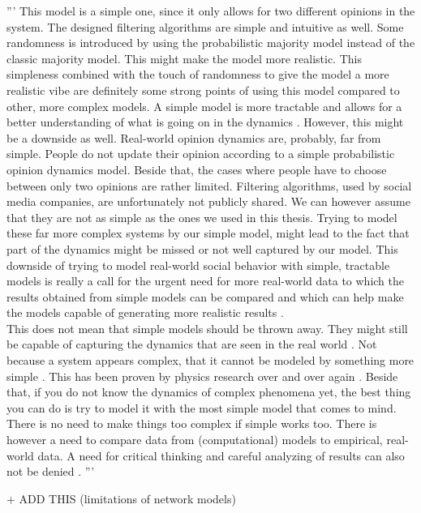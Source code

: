 \documentclass[11 pt , letterpaper , twoside , openright]{book}
\begin{document}
''' This model is a simple one, since it only allows for two different opinions in the system. The designed filtering algorithms are simple and intuitive as well. Some randomness is introduced by using the probabilistic majority model instead of the classic majority model. This might make the model more realistic. This simpleness combined with the touch of randomness to give the model a more realistic vibe are definitely some strong points of using this model compared to other, more complex models. A simple model is more tractable and allows for a better understanding of what is going on in the dynamics \cite{Jed2019}. However, this might be a downside as well. Real-world opinion dynamics are, probably, far from simple. People do not update their opinion according to a simple probabilistic opinion dynamics model. Beside that, the cases where people have to choose between only two opinions are rather limited. Filtering algorithms, used by social media companies, are unfortunately not publicly shared. We can however assume that they are not as simple as the ones we used in this thesis. Trying to model these far more complex systems by our simple model, might lead to the fact that part of the dynamics might be missed or not well captured by our model. This downside of trying to model real-world social behavior with simple, tractable models is really a call for the urgent need for more real-world data to which the results obtained from simple models can be compared and which can help make the models capable of generating more realistic results \cite{Castellano2009}\cite{Pawel}. \\
\newline
This does not mean that simple models should be thrown away. They might still be capable of capturing the dynamics that are seen in the real world \cite{Gug2015}. Not because a system appears complex, that it cannot be modeled by something more simple \cite{Jed2019}. This has been proven by physics research over and over again \cite{Gug2015}. Beside that, if you do not know the dynamics of complex phenomena yet, the best thing you can do is try to model it with the most simple model that comes to mind. There is no need to make things too complex if simple works too. There is however a need to compare data from (computational) models to empirical, real-world data. A need for critical thinking and careful analyzing of results can also not be denied \cite{Pawel}. '''

+ ADD THIS (limitations of network models)
\end{document}
